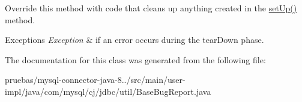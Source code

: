 Override this method with code that cleans up anything created in the \mbox{\hyperlink{classcom_1_1mysql_1_1cj_1_1jdbc_1_1util_1_1_base_bug_report_ad320a1b51efdb6c84a11050708d59d51}{set\+Up()}} method.


\begin{DoxyExceptions}{Exceptions}
{\em Exception} & if an error occurs during the \textquotesingle{}tear\+Down\textquotesingle{} phase. \\
\hline
\end{DoxyExceptions}


The documentation for this class was generated from the following file\+:\begin{DoxyCompactItemize}
\item 
pruebas/mysql-\/connector-\/java-\/8../src/main/user-\/impl/java/com/mysql/cj/jdbc/util/Base\+Bug\+Report.\+java\end{DoxyCompactItemize}

